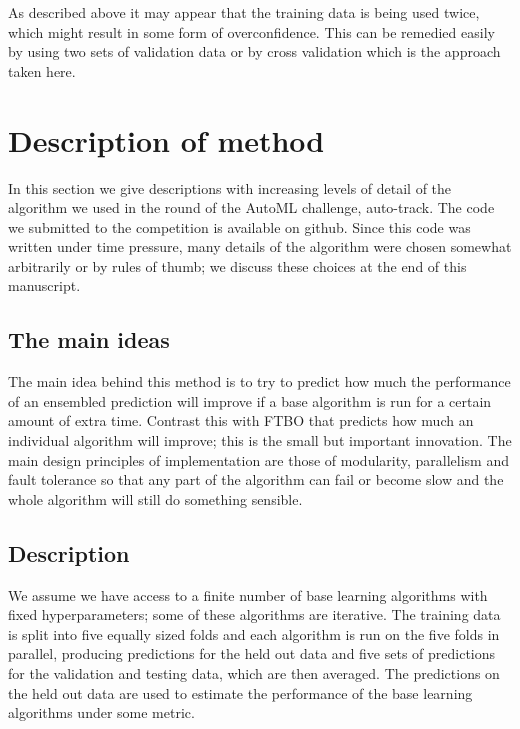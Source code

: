 \documentclass{article} %
\begin{document}

As described above it may appear that the training data is being used twice, which might result in some form of overconfidence.
This can be remedied easily by using two sets of validation data or by cross validation which is the approach taken here.

\section{Description of method}
\label{sec:method}

In this section we give descriptions with increasing levels of detail of the algorithm we used in the  round of the AutoML challenge, auto-track.
The code we submitted to the competition is available on github\footnotemark{}.
Since this code was written under time pressure, many details of the algorithm were chosen somewhat arbitrarily or by rules of thumb; we discuss these choices at the end of this manuscript.

\footnotetext{[Redacted]}

\subsection{The main ideas}

The main idea behind this method is to try to predict how much the performance of an ensembled prediction will improve if a base algorithm is run for a certain amount of extra time.
Contrast this with FTBO that predicts how much an individual algorithm will improve; this is the small but important innovation.
The main design principles of implementation are those of modularity, parallelism and fault tolerance so that any part of the algorithm can fail or become slow and the whole algorithm will still do something sensible.

\subsection{Description}

We assume we have access to a finite number of base learning algorithms with fixed hyperparameters; some of these algorithms are iterative.
The training data is split into five equally sized folds and each algorithm is run on the five folds in parallel, producing predictions for the held out data and five sets of predictions for the validation and testing data, which are then averaged.
The predictions on the held out data are used to estimate the performance of the base learning algorithms under some metric.
\end{document}
